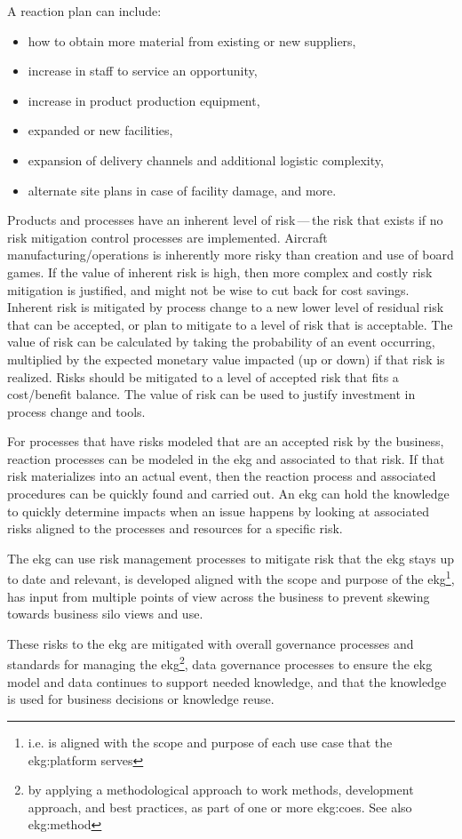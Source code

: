 A reaction plan can include:
\begin{itemize}
    \item how to obtain more material from existing or new suppliers,
    \item increase in staff to service an opportunity,
    \item increase in product production equipment,
    \item expanded or new facilities,
    \item expansion of delivery channels and additional logistic complexity,
    \item alternate site plans in case of facility damage, and more.
\end{itemize}

Products and processes have an inherent level of risk\,---\,the risk that exists if no risk mitigation control
processes are implemented.
Aircraft manufacturing/operations is inherently more risky than creation and use of board games.
If the value of inherent risk is high, then more complex and costly risk mitigation is justified,
and might not be wise to cut back for cost savings.
Inherent risk is mitigated by process change to a new lower level of residual risk that can be accepted,
or plan to mitigate to a level of risk that is acceptable.
The value of risk can be calculated by taking the probability of an event occurring,
multiplied by the expected monetary value impacted (up or down) if that risk is realized.
Risks should be mitigated to a level of accepted risk that fits a cost/benefit balance.
The value of risk can be used to justify investment in process change and tools.

\ekgmmContextSection

\ekgmmHowEKGAffectsThisCapability

For processes that have risks modeled that are an accepted risk by the business,
reaction processes can be modeled in the \gls{ekg} and associated to that risk.
If that risk materializes into an actual event,
then the reaction process and associated procedures can be quickly found and carried out.
An \gls{ekg} can hold the knowledge to quickly determine impacts when an issue happens by looking at
associated risks aligned to the processes and resources for a specific risk.

\ekgmmHowEKGRequiresThisCapability

The \gls{ekg} can use risk management processes to mitigate risk that the \gls{ekg}
stays up to date and relevant,
is developed aligned with the scope and purpose of the \gls{ekg}\footnote{%
    i.e. is aligned with the scope and purpose of each use case that the \gls{ekg:platform} serves%
},
has input from multiple points of view across the business to prevent skewing towards business silo views and use.

These risks to the \gls{ekg} are mitigated with
overall governance processes and standards for managing the \gls{ekg}\footnote{%
    by applying a methodological approach to work methods, development approach, and best practices,
    as part of one or more \glspl{ekg:coe}. See also \gls{ekg:method}%
},
data governance processes to ensure the \gls{ekg} model and data continues to support needed knowledge,
and that the knowledge is used for business decisions or knowledge reuse.
